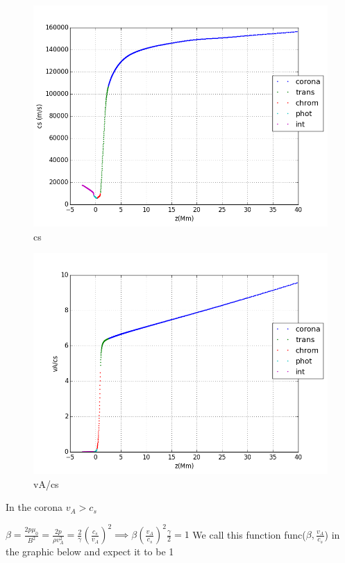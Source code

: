\documentclass[10pt]{book}
\begin{document}
\begin{figure}[H]
 \centering
 \includegraphics[scale=0.5]{fromFile5.png}
 \caption{cs}
\end{figure}

\begin{figure}[H]
 \centering
 \includegraphics[scale=0.5]{fromFile6.png}
 \caption{vA/cs}
\end{figure}

In the corona $v_A > c_s$



$\beta = \frac{2 p \mu_0}{B^2} = \frac{2 p}{\rho v_A^2} = \frac{2 }{\gamma}(\frac{c_s}{v_A})^2
\implies \beta (\frac{v_A}{c_s})^2 \frac{\gamma}{2} = 1 $
We call this function func($\beta, \frac{v_A}{c_s}$) in the graphic below and expect it to be 1
\end{document}
